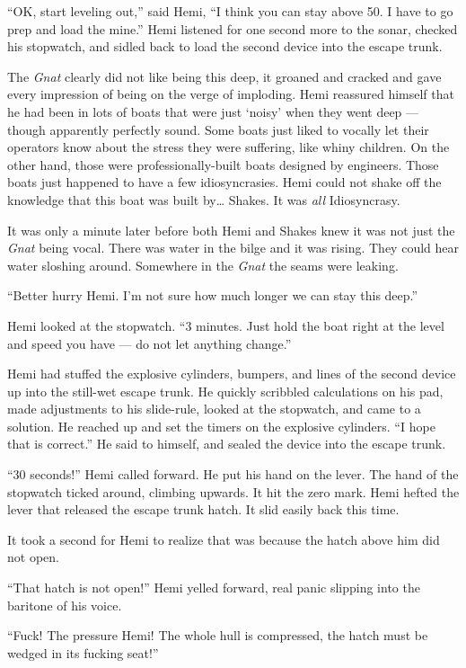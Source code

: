 \documentclass[
]{scrbook}
\begin{document}
``OK, start leveling out,'' said Hemi, ``I think you can stay above 50.
I have to go prep and load the mine.'' Hemi listened for one second more
to the sonar, checked his stopwatch, and sidled back to load the second
device into the escape trunk.

The \emph{Gnat} clearly did not like being this deep, it groaned and
cracked and gave every impression of being on the verge of imploding.
Hemi reassured himself that he had been in lots of boats that were just
`noisy' when they went deep --- though apparently perfectly sound. Some
boats just liked to vocally let their operators know about the stress
they were suffering, like whiny children. On the other hand, those were
professionally-built boats designed by engineers. Those boats just
happened to have a few idiosyncrasies. Hemi could not shake off the
knowledge that this boat was built by\ldots{} Shakes. It was \emph{all}
Idiosyncrasy.

It was only a minute later before both Hemi and Shakes knew it was not
just the \emph{Gnat} being vocal. There was water in the bilge and it
was rising. They could hear water sloshing around. Somewhere in the
\emph{Gnat} the seams were leaking.

``Better hurry Hemi. I'm not sure how much longer we can stay this
deep.''

Hemi looked at the stopwatch. ``3 minutes. Just hold the boat right at
the level and speed you have --- do not let anything change.''

Hemi had stuffed the explosive cylinders, bumpers, and lines of the
second device up into the still-wet escape trunk. He quickly scribbled
calculations on his pad, made adjustments to his slide-rule, looked at
the stopwatch, and came to a solution. He reached up and set the timers
on the explosive cylinders. ``I hope that is correct.'' He said to
himself, and sealed the device into the escape trunk.

``30 seconds!'' Hemi called forward. He put his hand on the lever. The
hand of the stopwatch ticked around, climbing upwards. It hit the zero
mark. Hemi hefted the lever that released the escape trunk hatch. It
slid easily back this time.

It took a second for Hemi to realize that was because the hatch above
him did not open.

``That hatch is not open!'' Hemi yelled forward, real panic slipping
into the baritone of his voice.

``Fuck! The pressure Hemi! The whole hull is compressed, the hatch must
be wedged in its fucking seat!''
\end{document}
